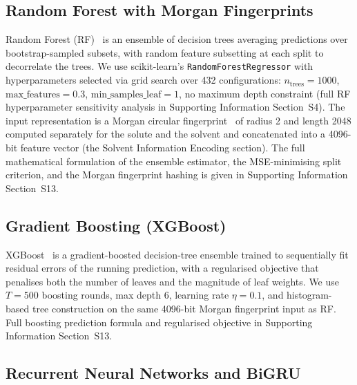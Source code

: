 \documentclass[journal=jcisd8,manuscript=article]{achemso}
\begin{document}
\FloatBarrier
\subsection{Random Forest with Morgan Fingerprints}
\label{sec:rf}

Random Forest (RF)~\cite{breiman2001random} is an ensemble of decision trees averaging predictions over bootstrap-sampled subsets, with random feature subsetting at each split to decorrelate the trees. We use scikit-learn's \texttt{RandomForestRegressor} with hyperparameters selected via grid search over 432 configurations: $n_\text{trees} = 1000$, $\text{max\_features} = 0.3$, $\text{min\_samples\_leaf} = 1$, no maximum depth constraint (full RF hyperparameter sensitivity analysis in Supporting Information Section~S4). The input representation is a Morgan circular fingerprint~\cite{rogers2010extended} of radius 2 and length 2048 computed separately for the solute and the solvent and concatenated into a 4096-bit feature vector (the Solvent Information Encoding section). The full mathematical formulation of the ensemble estimator, the MSE-minimising split criterion, and the Morgan fingerprint hashing is given in Supporting Information Section~S13.


\subsection{Gradient Boosting (XGBoost)}
\label{sec:xgboost}

XGBoost~\cite{chen2016xgboost} is a gradient-boosted decision-tree ensemble trained to sequentially fit residual errors of the running prediction, with a regularised objective that penalises both the number of leaves and the magnitude of leaf weights. We use $T = 500$ boosting rounds, max depth 6, learning rate $\eta = 0.1$, and histogram-based tree construction on the same 4096-bit Morgan fingerprint input as RF. Full boosting prediction formula and regularised objective in Supporting Information Section~S13.


\subsection{Recurrent Neural Networks and BiGRU}
\label{sec:bigru}
\end{document}
